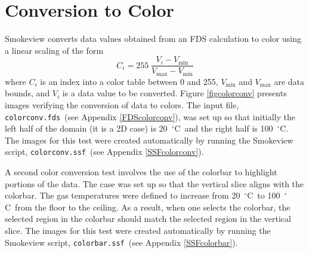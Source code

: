 \documentclass[11pt,twoside]{book}
\newcommand{\degC}{$^\circ$C}
\begin{document}
\clearpage

\section{Conversion to Color}

Smokeview converts data values obtained from an FDS calculation
to color using a linear scaling of the form
\begin{equation}
C_i=255 \; \frac{V_i-V_{\min}}{V_{\max}-V_{\min}}
\end{equation}
where $C_i$ is an index into a color table between 0 and 255, $V_{\min}$ and $V_{\max}$  are data bounds,
and $V_i$ is a data value to be converted.
Figure \ref{figcolorconv} presents images verifying the conversion of data to colors.
The input file, {\tt colorconv.fds}\ (see Appendix \ref{FDScolorconv}), was set up so that
initially the left half of the domain (it is a 2D case) is 20~\degC\ and the right half is 100~\degC.
The images for this test were created automatically by running the Smokeview script, {\tt colorconv.ssf}\ (see Appendix \ref{SSFcolorconv}).

A second color conversion test involves the use of the colorbar to highlight portions of the data.  The case was set up so that the vertical slice aligns with the colorbar.  The gas temperatures were defined to increase from 20~\degC\ to 100~\degC\ from the floor to the ceiling.  As a result, when one selects the colorbar, the selected region in the colorbar should match the selected region in the vertical slice.
The images for this test were created automatically by running the Smokeview script, {\tt colorbar.ssf}\ (see Appendix \ref{SSFcolorbar}).
\end{document}
